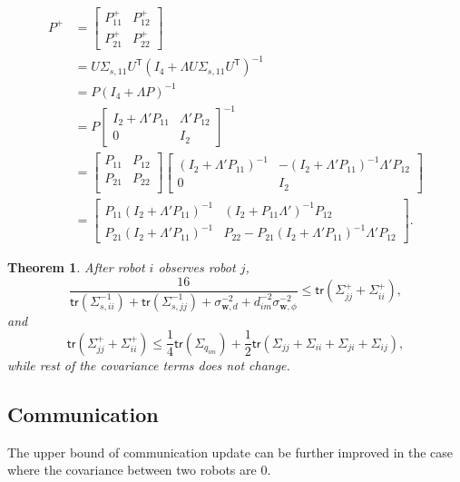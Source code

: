 \documentclass[xcolor=x11names]{article}
\DeclareMathOperator\T{\mathsf{T}}
\newtheorem{theorem}{Theorem}
\begin{document}
   \begin{align*}
          P^+ &= 
          \begin{bmatrix} 
            P^+_{11}  & P^+_{12}\\
            P^+_{21} & P^+_{22}
          \end{bmatrix} \\          
          &= U \Sigma_{s,11} U^{\T} \left(I_4  + \Lambda U \Sigma_{s,11} U^{\T} \right)^{-1}  \\
          &= P \left(I_4  + \Lambda P\right)^{-1} \\
          &= P
          \begin{bmatrix} 
            I_2 + \Lambda' P_{11}&  \Lambda' P_{12}\\
            0  & I_{2}
          \end{bmatrix}^{-1} \\
          &= 
          \begin{bmatrix} 
            P_{11} & P_{12}\\
            P_{21} & P_{22}\\
          \end{bmatrix} 
          \begin{bmatrix} 
            \left(I_2 + \Lambda' P_{11}   \right)^{-1} &  -\left(I_2 + \Lambda' P_{11}   \right)^{-1}\Lambda' P_{12}\\
            0  & I_{2}
          \end{bmatrix} \\
          &=
          \begin{bmatrix} 
            P_{11}\left(I_2 + \Lambda'   P_{11} \right)^{-1} &  \left(I_2 + P_{11} \Lambda'   \right)^{-1}P_{12} \\
            P_{21}\left(I_2 + \Lambda'   P_{11} \right)^{-1}  & P_{22} - P_{21}\left(I_2 + \Lambda'   P_{11} \right)^{-1}\Lambda' P_{12}
          \end{bmatrix}.
   \end{align*}        

       
       
\begin{theorem}
   After robot $i$  observes robot $j$,
   \begin{equation}
    \frac{16}{\mathsf{tr}\left(  \Sigma_{s,ii}^{-1}\right) + \mathsf{tr}\left(  \Sigma_{s,jj}^{-1}\right) + \sigma^{-2}_{\mathbf{w},d} + d_{im}^{-2} \sigma^{-2}_{\mathbf{w},\phi}}  \leq \mathsf{tr}\left(\Sigma^+_{jj} + \Sigma^+_{ii}\right),
   \end{equation}
   and
   \begin{equation}
    \mathsf{tr}\left(\Sigma^+_{jj} + \Sigma^+_{ii}\right) \leq \frac{1}{4} \mathsf{tr}(\Sigma_{q_{im}}) + \frac{1}{2} \mathsf{tr}\left(\Sigma_{jj} + \Sigma_{ii} + \Sigma_{ji} + \Sigma_{ij}\right),
   \end{equation}   
   while rest of the covariance terms does not change.
\end{theorem}        



\subsection{Communication}

   The upper bound of communication update can be further improved in the case where the covariance between two robots are $0$.





{\footnotesize }
\end{document}
